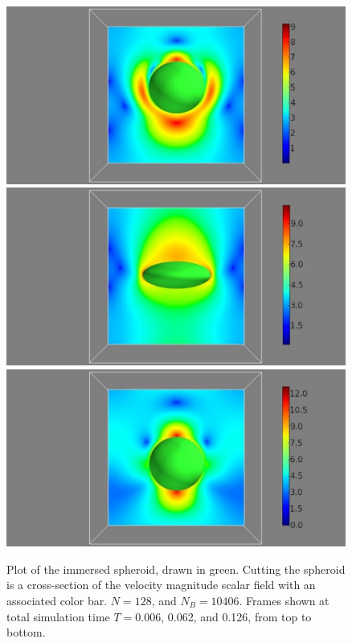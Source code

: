  \begin{figure}[htb]
	\begin{center}
		\includegraphics[bb=.0in .4in 11.5in 6.1in,width=4.4in,clip]{Images_Methodology/SpherePlot_3c.pdf}
		\hfill
		\includegraphics[bb=.0in .4in 11.5in 6.1in,width=4.4in,clip]{Images_Methodology/SpherePlot_31c.pdf}
		\hfill
		\includegraphics[bb=.0in .4in 11.5in 6.1in,width=4.4in,clip]{Images_Methodology/SpherePlot_63c.pdf}
	\end{center}
	\caption{\small Plot of the immersed spheroid, drawn in green. Cutting the spheroid is a cross-section of the velocity magnitude scalar field with an associated color bar. $N=128$, and $N_B=10406$. Frames shown at total simulation time $T=0.006$, 0.062, and 0.126, from top to bottom.}
\label{fig:TimeProgression_Sphere}
\end{figure}



